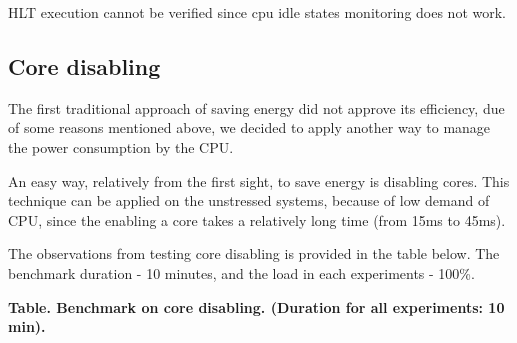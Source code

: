 \documentclass[]{report}
\begin{document}
HLT execution cannot be verified since cpu idle states monitoring does
not work.

\subsection{Core disabling}\label{core-disabling}

The first traditional approach of saving energy did not approve its
efficiency, due of some reasons mentioned above, we decided to apply
another way to manage the power consumption by the CPU.

An easy way, relatively from the first sight, to save energy is
disabling cores. This technique can be applied on the unstressed
systems, because of low demand of CPU, since the enabling a core takes a
relatively long time (from 15ms to 45ms).

The observations from testing core disabling is provided in the table
below. The benchmark duration - 10 minutes, and the load in each
experiments - 100\%.

\textbf{Table. Benchmark on core disabling. (Duration for all
experiments: 10 min).}
\end{document}
